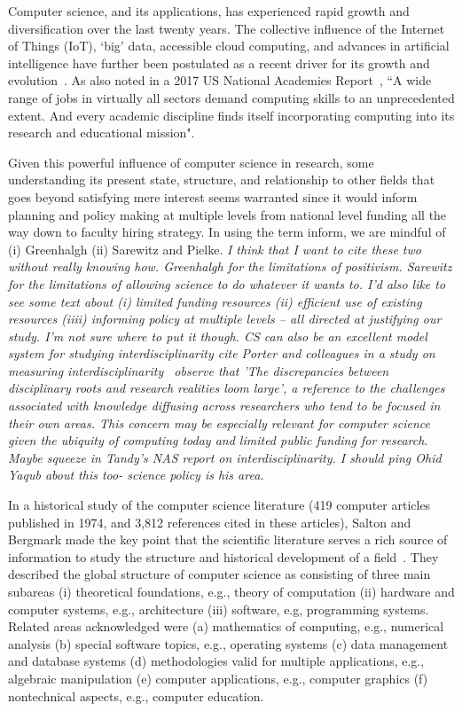 Computer science, and its applications, has experienced rapid growth and diversification over the last twenty years. The collective influence of the Internet of Things (IoT), `big' data, accessible cloud computing, and advances in artificial intelligence have further been postulated as a recent driver for its growth and evolution~\cite{siebel2019_digital}. As also noted in a 2017 US National Academies Report~\cite{nas_2017}, ``A wide range of jobs in virtually all sectors demand computing skills to an unprecedented extent. And every academic discipline finds itself incorporating computing into its research and educational mission".

Given this powerful influence of computer science in research, some understanding its present state, structure, and relationship to other fields that goes beyond satisfying mere interest seems warranted since it would inform planning and policy making at multiple levels from national level funding all the way down to faculty hiring strategy. In using the term inform, we are mindful of (i) Greenhalgh (ii) Sarewitz and Pielke. \emph{I think that I want to cite these two without really knowing how. Greenhalgh for the limitations of positivism. Sarewitz for the limitations of allowing science to do whatever it wants to. I'd also like to see some text about (i) limited funding resources (ii) efficient use of existing resources (iiii) informing policy at multiple levels -- all directed at justifying our study. I'm not sure where to put it though. CS can also be an excellent model system for studying interdisciplinarity cite Porter and colleagues in a study on measuring interdisciplinarity~\cite{porter_measuring_2007 } observe that 'The discrepancies between disciplinary roots and research realities loom large', a reference to the challenges associated with knowledge diffusing across researchers who tend to be focused in their own areas. This concern may be especially relevant for computer science given the ubiquity of computing today and limited public funding for research. Maybe squeeze in Tandy's NAS report on interdisciplinarity. I should ping Ohid Yaqub about this too- science policy is his area.}

In a historical study of the computer science literature (419 computer articles published in 1974,  and 3,812 references cited in these articles), Salton and Bergmark made the key point that the scientific literature serves a rich source of information to study the structure and historical development of a field~\cite{salton_citation_1979}. They described the global structure of computer science as consisting of three main subareas (i) theoretical foundations, e.g., theory of computation (ii) hardware and computer systems, e.g., architecture (iii) software, e.g, programming systems.  Related areas acknowledged were  (a) mathematics of computing, e.g., numerical analysis (b) special software topics, e.g., operating systems (c) data management and database systems (d) methodologies valid for multiple applications, e.g., algebraic manipulation (e) computer applications, e.g., computer graphics (f) nontechnical aspects, e.g., computer education. 


